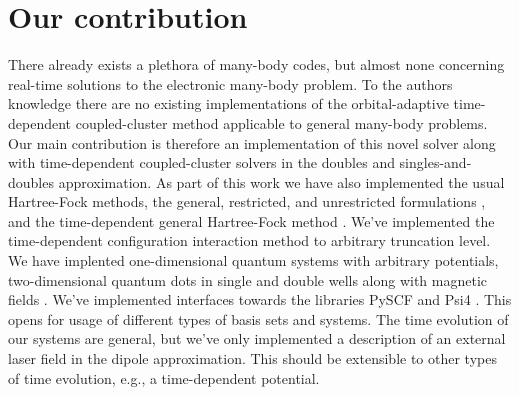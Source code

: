     \section{Our contribution}
        There already exists a plethora of many-body codes, but almost none
        concerning real-time solutions to the electronic many-body problem.
        To the authors knowledge there are no existing implementations of the
        orbital-adaptive time-dependent coupled-cluster method applicable to
        general many-body problems.
        Our main contribution is therefore an implementation of this novel
        solver along with time-dependent coupled-cluster solvers in the doubles
        and singles-and-doubles approximation.
        As part of this work we have also implemented the usual Hartree-Fock
        methods, the general, restricted, and unrestricted formulations
        \cite{szabo1996modern}, and the time-dependent general Hartree-Fock
        method \cite{hochstuhl2014time}.
        We've implemented the time-dependent configuration interaction method
        to arbitrary truncation level.
        We have implented one-dimensional quantum systems with arbitrary
        potentials, two-dimensional quantum dots in single and double wells
        along with magnetic fields \cite{greg-winther}.
        We've implemented interfaces towards the libraries PySCF \cite{pyscf}
        and Psi4 \cite{psi4}.
        This opens for usage of different types of basis sets and systems.
        The time evolution of our systems are general, but we've only
        implemented a description of an external laser field in the dipole
        approximation.
        This should be extensible to other types of time evolution, e.g., a
        time-dependent potential.

